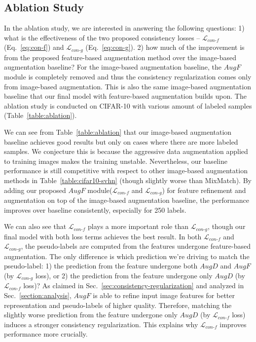 \documentclass[runningheads]{llncs}
\begin{document}
\subsection{Ablation Study}

In the ablation study, we are interested in answering the following questions:
1) what is the effectiveness of the two proposed consistency losses -- $\mathcal{L}_{con\text{-}f}$ (Eq.~\ref{eq:con-f}) and $\mathcal{L}_{con\text{-}g}$ (Eq.~\ref{eq:con-g}).
2) how much of the improvement is from the proposed feature-based augmentation method over the image-based augmentation baseline?
For the image-based augmentation baseline, the $AugF$ module is completely removed and thus the consistency regularization comes only from image-based augmentation.
This is also the same image-based augmentation baseline that our final model with feature-based augmentation builds upon.
The ablation study is conducted on CIFAR-10 with various amount of labeled samples (Table~\ref{table:ablation}).

We can see from Table~\ref{table:ablation} that our image-based augmentation baseline achieves good results but only on cases where there are more labeled samples.
We conjecture this is because the aggressive data augmentation applied to training images makes the training unstable.
Nevertheless, our baseline performance is still competitive with respect to other image-based augmentation methods in Table~\ref{table:cifar10-svhn} (though slightly worse than MixMatch).
By adding our proposed $AugF$ module($\mathcal{L}_{con\text{-}f}$ and $\mathcal{L}_{con\text{-}g}$) for feature refinement and augmentation on top of the image-based augmentation baseline, the performance improves over baseline consistently, especially for 250 labels. 

We can also see that $\mathcal{L}_{con\text{-}f}$ plays a more important role than $\mathcal{L}_{con\text{-}g}$, though our final model with both loss terms achieves the best result.
In both $\mathcal{L}_{con\text{-}f}$ and $\mathcal{L}_{con\text{-}g}$, the pseudo-labels are computed from the features undergone feature-based augmentation.
The only difference is which prediction we're driving to match the pseudo-label: 1) the prediction from the feature undergone both $AugD$ and $AugF$ (by $\mathcal{L}_{con\text{-}g}$ loss), or 2) the prediction from the feature undergone only $AugD$ (by $\mathcal{L}_{con\text{-}f}$ loss)?
As claimed in Sec.~\ref{sec:consistency-regularization} and analyzed in Sec.~\ref{section:analysis}, $AugF$ is able to refine input image features for better representation and pseudo-labels of higher quality.
Therefore, matching the slightly worse prediction from the feature undergone only $AugD$ (by $\mathcal{L}_{con\text{-}f}$ loss) induces a stronger consistency regularization.
This explains why $\mathcal{L}_{con\text{-}f}$ improves performance more crucially.
\end{document}
